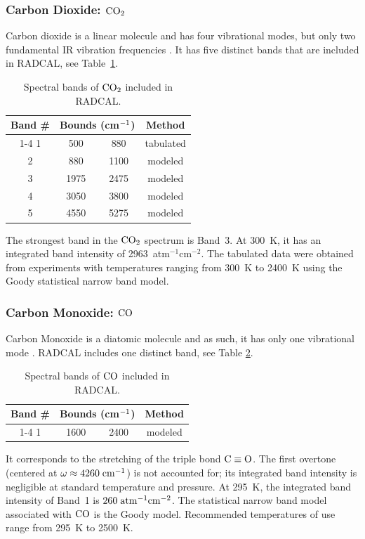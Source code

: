 \subsubsection{Carbon Dioxide: $\rm CO_2$}

Carbon dioxide is a linear molecule and has four vibrational modes, but only two fundamental IR vibration frequencies \cite{Herzberg:1949}. It has five distinct bands that are included in RADCAL, see Table~\ref{Table::CO2}.
\begin{table}[h!]
    \centering
    \caption[Spectral bands of $\rm CO_2$ included in RADCAL]{Spectral bands of $\rm CO_2$ included in RADCAL.}
    \vspace{0.1in}
    \label{Table::CO2}
    \begin{tabular}{|c|c|c|c|}
      \hline
      Band \# & \multicolumn{2}{|l|}{Bounds (cm$\rm ^{-1}$) } & Method \\
      \cline{1-4}
      1 &  500 & 880  & tabulated \\
      2 &  880 & 1100 & modeled \\
      3 & 1975 & 2475 & modeled \\
      4 & 3050 & 3800 & modeled \\
      5 & 4550 & 5275 & modeled \\
      \hline
    \end{tabular}
\end{table}
The strongest band in the $\rm CO_2$ spectrum is Band~3. At 300~K, it has an integrated band intensity of 2963~atm$^{-1}$cm$^{-2}$. The tabulated data were obtained from experiments with temperatures ranging from 300~K to 2400~K using the Goody statistical narrow band model.

\subsubsection{Carbon Monoxide: $\rm CO$}

Carbon Monoxide is a diatomic molecule and as such, it has only one vibrational mode \cite{Herzberg:1949}. RADCAL includes one distinct band, see Table \ref{Table::CO}.
\begin{table}[h!]
    \centering
    \caption[Spectral bands of $\rm CO$ included in RADCAL]{Spectral bands of $\rm CO$ included in RADCAL.}
    \vspace{0.1in}
    \label{Table::CO}
    \begin{tabular}{|c|c|c|c|}
      \hline
      Band \# & \multicolumn{2}{|l|}{Bounds (cm$\rm ^{-1}$) } & Method \\
      \cline{1-4}
      1 & 1600 & 2400 & modeled \\
      \hline
    \end{tabular}
\end{table}
It corresponds to the stretching of the triple bond $\rm C \equiv O$. The first overtone (centered at $ \omega\approx 4260\;\rm {cm^{-1}}$) is not accounted for; its integrated band intensity is negligible at standard temperature and pressure. At 295~K, the integrated band intensity of Band~1 is $260\;\rm {atm^{-1}cm^{-2}}$.
The statistical narrow band model associated with $\rm CO$ is the Goody model. Recommended temperatures of use range from 295~K to 2500~K.

